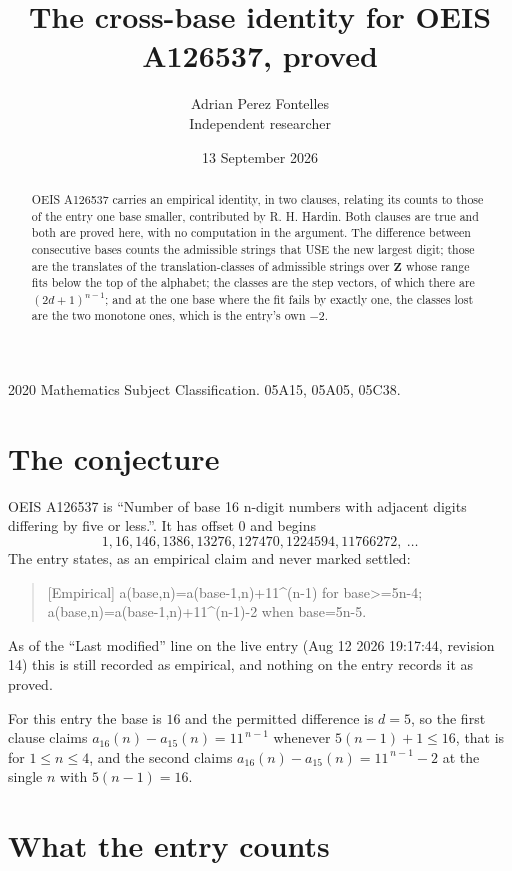 \documentclass[11pt,a4paper]{article}
\title{The cross-base identity for OEIS A126537, proved}
\author{Adrian Perez Fontelles\\ \small Independent researcher}
\date{13 September 2026}
\theoremstyle{plain}
\theoremstyle{definition}
\begin{document}
\maketitle

\begin{abstract}
OEIS A126537 carries an empirical identity, in two clauses, relating its counts to those of the
entry one base smaller, contributed by R. H. Hardin. Both clauses are true and both are proved
here, with no computation in the argument. The difference between consecutive bases counts the
admissible strings that USE the new largest digit; those are the translates of the
translation-classes of admissible strings over $\mathbf{Z}$ whose range fits below the top of
the alphabet; the classes are the step vectors, of which there are $(2d+1)^{n-1}$; and at the
one base where the fit fails by exactly one, the classes lost are the two monotone ones, which
is the entry's own $-2$.
\end{abstract}

\noindent\small 2020 Mathematics Subject Classification. 05A15, 05A05, 05C38.\normalsize

\section{The conjecture}

OEIS A126537 is ``Number of base 16 n-digit numbers with adjacent digits differing by five or less.''. It has offset $0$ and begins
\[
1, 16, 146, 1386, 13276, 127470, 1224594, 11766272,\ \dots
\]
The entry states, as an empirical claim and never marked settled:
\begin{quote}
[Empirical] a(base,n)=a(base-1,n)+11\textasciicircum{}(n-1) for base>=5n-4; a(base,n)=a(base-1,n)+11\textasciicircum{}(n-1)-2 when base=5n-5.
\end{quote}
As of the ``Last modified'' line on the live entry (Aug 12 2026 19:17:44, revision 14)
this is still recorded as empirical, and nothing on the entry records it as proved.

For this entry the base is $16$ and the permitted difference is $d=5$, so the first clause
claims $a_{16}(n)-a_{15}(n)=11^{\,n-1}$ whenever $5(n-1)+1\le16$, that is for
$1\le n\le4$, and the second claims $a_{16}(n)-a_{15}(n)=11^{\,n-1}-2$ at the single
$n$ with $5(n-1)=16$.

\section{What the entry counts}
\end{document}
